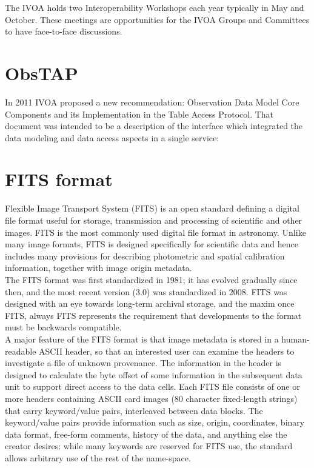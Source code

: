 The IVOA holds two Interoperability Workshops each year typically in May and October. These meetings are opportunities for the IVOA Groups and Committees to have face-to-face discussions.

\section{ObsTAP}

In 2011 IVOA proposed a new recommendation: Observation Data Model Core Components and its Implementation in the Table Access Protocol. That document was intended to be a description of the interface which integrated the data modeling and data access aspects in a single service:\\ 



\section{FITS format}
 
Flexible Image Transport System (FITS) is an open standard defining a digital file format useful for storage, transmission and processing of scientific and other images. FITS is the most commonly used digital file format in astronomy. Unlike many image formats, FITS is designed specifically for scientific data and hence includes many provisions for describing photometric and spatial calibration information, together with image origin metadata.\\

The FITS format was first standardized in 1981; it has evolved gradually since then, and the most recent version (3.0) was standardized in 2008. FITS was designed with an eye towards long-term archival storage, and the maxim once FITS, always FITS represents the requirement that developments to the format must be backwards compatible.\\
 
A major feature of the FITS format is that image metadata is stored in a human-readable ASCII header, so that an interested user can examine the headers to investigate a file of unknown provenance. The information in the header is designed to calculate the byte offset of some information in the subsequent data unit to support direct access to the data cells. Each FITS file consists of one or more headers containing ASCII card images (80 character fixed-length strings) that carry keyword/value pairs, interleaved between data blocks. The keyword/value pairs provide information such as size, origin, coordinates, binary data format, free-form comments, history of the data, and anything else the creator desires: while many keywords are reserved for FITS use, the standard allows arbitrary use of the rest of the name-space.\\
 
